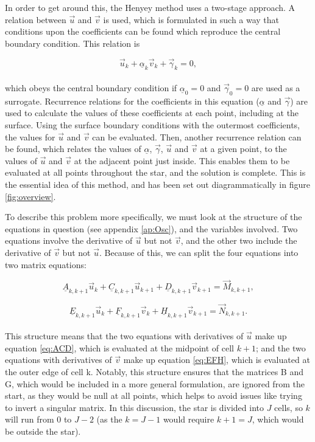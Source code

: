 \documentclass[11pt]{amsart}
\begin{document}
In order to get around this, the Henyey method uses a two-stage approach.  A relation between $\vec{u}$ and $\vec{v}$ is used, which is formulated in such a way that conditions upon the coefficients can be found which reproduce the central boundary condition.  This relation is

\begin{equation} \label{eq:relation}
\vec{u}_{k}  + \underline{\alpha}_{k}  \vec{v}_{k}  + \vec{\gamma}_{k}  = 0,
\end{equation}
\\
which obeys the central boundary condition if $\underline{\alpha}_{0} = 0$ and $\vec{\gamma}_{0} = 0$ are used as a surrogate.  Recurrence relations for the coefficients in this equation ($\underline{\alpha}$ and $\vec{\gamma}$) are used to calculate the values of these coefficients at each point, including at the surface.  Using the surface boundary conditions with the outermost coefficients, the values for $\vec{u}$ and $\vec{v}$ can be evaluated.  Then, another recurrence relation can be found, which relates the values of $\underline{\alpha}$, $\vec{\gamma}$, $\vec{u}$ and $\vec{v}$ at a given point, to the values of $\vec{u}$ and $\vec{v}$ at the adjacent point just inside.  This enables them to be evaluated at all points throughout the star, and the solution is complete.  This is the essential idea of this method, and has been set out diagrammatically in figure \ref{fig:overview}.

To describe this problem more specifically, we must look at the structure of the equations in question (see appendix \ref{ap:Osc}), and the variables involved.  Two equations involve the derivative of $\vec{u}$ but not $\vec{v}$, and the other two include the derivative of $\vec{v}$ but not $\vec{u}$.  Because of this, we can split the four equations into two matrix equations:

\begin{equation} \label{eq:ACD}
\underline{A}_{k,k+1} \vec{u}_{k} + \underline{C}_{k,k+1} \vec{u}_{k+1} + \underline{D}_{k,k+1} \vec{v}_{k+1} = \vec{M}_{k,k+1},
\end{equation} 

\begin{equation} \label{eq:EFH}
\underline{E}_{k,k+1} \vec{u}_{k} + \underline{F}_{k,k+1} \vec{v}_{k} + \underline{H}_{k,k+1} \vec{v}_{k+1} = \vec{N}_{k,k+1}.
\end{equation} 
\\

This structure means that the two equations with derivatives of $\vec{u}$ make up equation \ref{eq:ACD}, which is evaluated at the midpoint of cell $k+1$; and the two equations with derivatives of $\vec{v}$ make up equation \ref{eq:EFH}, which is evaluated at the outer edge of cell k.  Notably, this structure ensures that the matrices B and G, which would be included in a more general formulation, are ignored from the start, as they would be null at all points, which helps to avoid issues like trying to invert a singular matrix.  In this discussion, the star is divided into $J$ cells, so $k$ will run from $0$ to $J-2$ (as the $k = J-1$ would require $k+1 = J$, which would be outside the star).
\end{document}
